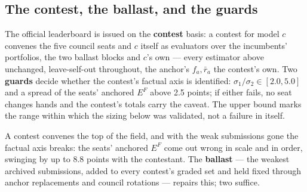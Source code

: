 \documentclass{article}
\begin{document}
\subsection{The contest, the ballast, and the guards}\label{the-contest-the-ballast-and-the-guards}

The official leaderboard is issued on the \textbf{contest} basis: a contest for model \(c\) convenes the five council seats and \(c\) itself as evaluators over the incumbents' portfolios, the two ballast blocks and \(c\)'s own --- every estimator above unchanged, leave-self-out throughout, the anchor's \(f_a,\bar r_a\) the contest's own. Two \textbf{guards} decide whether the contest's factual axis is identified: \(\sigma_1/\sigma_2\in[2.0,5.0]\) and a spread of the seats' anchored \(E^{F}\) above 2.5 points; if either fails, no seat changes hands and the contest's totals carry the caveat. The upper bound marks the range within which the sizing below was validated, not a failure in itself.

A contest convenes the top of the field, and with the weak submissions gone the factual axis breaks: the seats' anchored \(E^{F}\) come out wrong in scale and in order, swinging by up to 8.8 points with the contestant. The \textbf{ballast} --- the weakest archived submissions, added to every contest's graded set and held fixed through anchor replacements and council rotations --- repairs this; two suffice.
\end{document}
